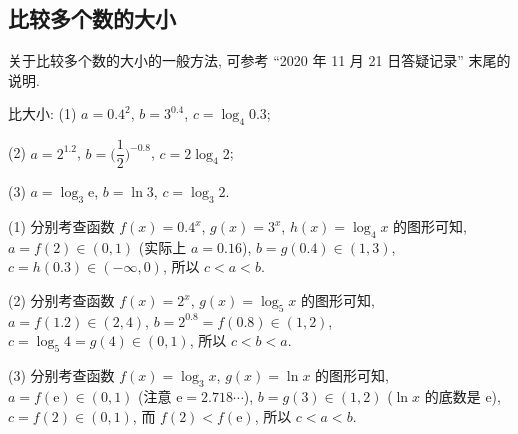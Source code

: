 \subsection{比较多个数的大小}

关于比较多个数的大小的一般方法, 可参考 ``2020 年 11 月 21 日答疑记录'' 末尾的说明.

\begin{example}
    比大小: (1) $a=0.4^2$, $b=3^{0.4}$, $c=\log_4 0.3$;
    
    (2) $a=2^{1.2}$, $b=\biggl(\dfrac12\biggr)^{-0.8}$, $c=2\log_4 2$;
    
    (3) $a=\log_3 \mathrm{e}$, $b=\ln 3$, $c=\log_3 2$.
\end{example}
\begin{solution}
    (1) 分别考查函数 $f(x)=0.4^x$, $g(x)=3^x$, $h(x)=\log_4 x$ 的图形可知, $a=f(2)\in(0,1)$ (实际上 $a=0.16$), $b=g(0.4)\in(1,3)$, $c=h(0.3)\in(-\infty,0)$, 所以 $c<a<b$.
    
    (2) 分别考查函数 $f(x)=2^x$, $g(x)= \log_5 x$ 的图形可知, $a=f(1.2)\in(2,4)$, $b=2^{0.8}=f(0.8)\in(1,2)$, $c=\log_5 4=g(4)\in(0,1)$, 所以 $c<b<a$.
    
    (3) 分别考查函数 $f(x)=\log_3 x$, $g(x)=\ln x$ 的图形可知, $a=f(\mathrm{e})\in(0,1)$ (注意 $\mathrm{e}=2.718\cdots$), $b=g(3)\in(1,2)$ ($\ln x$ 的底数是 $\mathrm{e}$), $c=f(2)\in(0,1)$, 而 $f(2)<f(\mathrm{e})$, 所以 $c<a<b$.
\end{solution}



